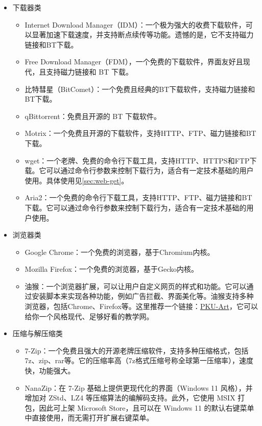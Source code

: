 \begin{itemize}
  \item 下载器类
    \begin{itemize}
      \item Internet Download Manager（IDM）：一个极为强大的收费下载软件，可以显著加速下载速度，并支持断点续传等功能。遗憾的是，它不支持磁力链接和BT下载。
      \item Free Download Manager（FDM），一个免费的下载软件，界面友好且现代，且支持磁力链接和 BT 下载。
      \item 比特彗星（BitComet）：一个免费且经典的BT下载软件，支持磁力链接和BT下载。
      \item qBittorrent：免费且开源的 BT 下载软件。
      \item Motrix：一个免费且开源的下载软件，支持HTTP、FTP、磁力链接和BT下载。
      \item wget：一个老牌、免费的命令行下载工具，支持HTTP、HTTPS和FTP下载。它可以通过命令行参数来控制下载行为，适合有一定技术基础的用户使用。具体使用见\ref{sec:web-get}。
      \item Aria2：一个免费的命令行下载工具，支持HTTP、FTP、磁力链接和BT下载。它可以通过命令行参数来控制下载行为，适合有一定技术基础的用户使用。
    \end{itemize}
  \item 浏览器类
    \begin{itemize}
      \item Google Chrome：一个免费的浏览器，基于Chromium内核。
      \item Mozilla Firefox：一个免费的浏览器，基于Gecko内核。
      \item 油猴：一个浏览器扩展，可以让用户自定义网页的样式和功能。它可以通过安装脚本来实现各种功能，例如广告拦截、界面美化等。油猴支持多种浏览器，包括Chrome、Firefox等。这里推荐一个链接：\href{https://github.com/zhuozhiyongde/PKU-Art}{PKU-Art}，它可以给你一个风格现代、足够好看的教学网。
    \end{itemize}
  \item 压缩与解压缩类
    \begin{itemize}
      \item 7-Zip：一个免费且强大的开源老牌压缩软件，支持多种压缩格式，包括7z、zip、rar等。它的压缩率高（7z格式压缩号称全球第一压缩率），速度快，功能强大。
      \item NanaZip：在 7-Zip 基础上提供更现代化的界面（Windows 11 风格），并增加对 ZStd、LZ4 等压缩算法的编解码支持。此外，它使用 MSIX 打包，因此可上架 Microsoft Store，且可以在 Windows 11 的默认右键菜单中直接使用，而无需打开扩展右键菜单。

\end{itemize}
\end{itemize}
